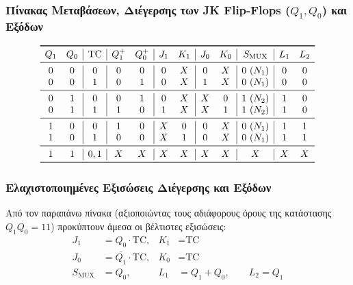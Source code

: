 \documentclass[11pt, a4paper]{article}
\begin{document}
\subsubsection*{Πίνακας Μεταβάσεων, Διέγερσης των JK Flip-Flops ($Q_1, Q_0$) και Εξόδων}

\[
\begin{array}{cc|c|cc|cc|cc|c|cc}
\toprule
Q_1 & Q_0 & \text{TC} & Q_1^+ & Q_0^+ & J_1 & K_1 & J_0 & K_0 & S_{\text{MUX}} & L_1 & L_2 \\
\midrule
0 & 0 & 0 & 0 & 0 & 0 & X & 0 & X & 0 \ (N_1) & 0 & 0 \\
0 & 0 & 1 & 0 & 1 & 0 & X & 1 & X & 0 \ (N_1) & 0 & 0 \\
\midrule
0 & 1 & 0 & 0 & 1 & 0 & X & X & 0 & 1 \ (N_2) & 1 & 0 \\
0 & 1 & 1 & 1 & 0 & 1 & X & X & 1 & 1 \ (N_2) & 1 & 0 \\
\midrule
1 & 0 & 0 & 1 & 0 & X & 0 & 0 & X & 0 \ (N_1) & 1 & 1 \\
1 & 0 & 1 & 0 & 0 & X & 1 & 0 & X & 0 \ (N_1) & 1 & 1 \\
\midrule
1 & 1 & 0, 1 & X & X & X & X & X & X & X & X & X \\
\bottomrule
\end{array}
\]

\subsubsection*{Ελαχιστοποιημένες Εξισώσεις Διέγερσης και Εξόδων}
Από τον παραπάνω πίνακα (αξιοποιώντας τους αδιάφορους όρους της κατάστασης $Q_1 Q_0 = 11$) προκύπτουν άμεσα οι βέλτιστες εξισώσεις:
\[
\boxed{\begin{aligned}
J_1 &= Q_0 \cdot \text{TC}, & K_1 &= \text{TC} \\
J_0 &= \overline{Q_1} \cdot \text{TC}, & K_0 &= \text{TC} \\
S_{\text{MUX}} &= Q_0, & L_1 &= Q_1 + Q_0, \qquad L_2 = Q_1
\end{aligned}}
\]
\end{document}
